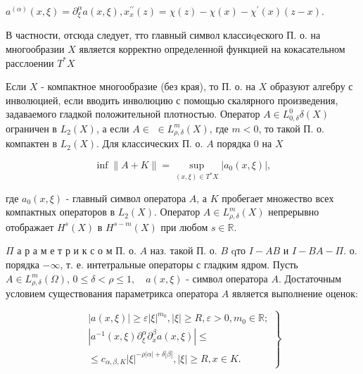 \documentclass[10pt]{article}
\begin{document}
$a^{(\alpha)}(x, \xi)=\partial_{\xi}^{\alpha} a(x, \xi), x_{x}^{\prime \prime}(z)=\chi(z)-\chi(x)-\chi^{\prime}(x)(z-x)$.



В частности, отсюда следует, тто главный символ классиqеского П. о. на многообразии $X$ является корректно определенной функцией на кокасательном расслоении $T^{*} X$



Если $X$ - компактное многообразие (без края), то П. о. на $X$ образуют алгебру с инволюцией, если вводить инволюцию с помощью скалярного произведения, задаваемого гладкой положительной плотностью. Оператор $A \in L_{0, \delta}^{0} \delta(X)$ ограничен в $L_{2}(X)$, а если $A \in$ $\in L_{\rho, \delta}^{m}(X)$, где $m<0$, то такой П. о. компактен в $L_{2}(X)$. Для классических П. о. $A$ порядка 0 на $X$



\[

\inf \|A+K\|=\sup _{(x, \xi) \in T^{*} X}\left|a_{0}(x, \xi)\right|,

\]



где $a_{0}(x, \xi)$ - главный символ оператора $A$, а $K$ пробегает множество всех компактных операторов в $L_{2}(X)$. Оператор $A \in L_{\rho, \delta}^{m}(X)$ непрерывно отображает $H^{s}(X)$ в $H^{s-m}(X)$ при любом $s \in \mathbb{R}$.



$\Pi$ а р а м е т р и к с о м П. о. $A$ наз. такой П. о. $B$ qто $I-A B$ и $I-B A-\Pi$. о. порядка $-\infty$, т. е. интетральные операторы с гладким ядром. Пусть $A \in L_{\rho, \delta}^{m}(\Omega)$, $0 \leqslant \delta<\rho \leqslant 1, \quad a(x, \xi)$ - символ оператора $A$. Достаточным условием существования параметрикса оператора $A$ является выполнение оценок:



\[

\left.\begin{array}{c}

|a(x, \xi)| \geqslant \varepsilon|\xi|^{m_{0}},|\xi| \geqslant R, \varepsilon>0, m_{0} \in \mathbb{R} ; \\

\left|a^{-1}(x, \xi) \partial_{\xi}^{\alpha} \partial_{x}^{\beta} a(x, \xi)\right| \leqslant \\

\leqslant c_{\alpha, \beta, K}|\xi|^{-\rho|\alpha|+\delta|\beta|},|\xi| \geqslant R, x \in K .

\end{array}\right\}

\]
\end{document}
